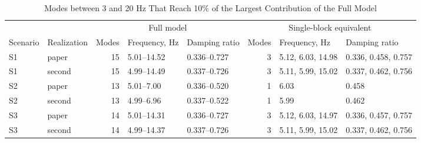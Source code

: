 \begin{table}[H]
\centering\small\setlength{\tabcolsep}{4.5pt}
\caption{Modes between 3 and 20 Hz That Reach 10\% of the Largest Contribution of the Full Model}
\label{tab:modes}
\begin{tabular}{llrllrll}\toprule
 & & \multicolumn{3}{c}{Full model} & \multicolumn{3}{c}{Single-block equivalent}\\
Scenario & Realization & Modes & Frequency, Hz & Damping ratio & Modes & Frequency, Hz & Damping ratio\\\midrule
S1 & paper & 15 & 5.01--14.52 & 0.336--0.727 & 3 & 5.12, 6.03, 14.98 & 0.336, 0.458, 0.757 \\
S1 & second & 15 & 4.99--14.49 & 0.337--0.726 & 3 & 5.11, 5.99, 15.02 & 0.337, 0.462, 0.756 \\
S2 & paper & 13 & 5.01--7.00 & 0.336--0.520 & 1 & 6.03 & 0.458 \\
S2 & second & 13 & 4.99--6.96 & 0.337--0.522 & 1 & 5.99 & 0.462 \\
S3 & paper & 14 & 5.01--14.31 & 0.336--0.727 & 3 & 5.12, 6.03, 14.97 & 0.336, 0.457, 0.757 \\
S3 & second & 14 & 4.99--14.37 & 0.337--0.726 & 3 & 5.11, 5.99, 15.02 & 0.337, 0.462, 0.756 \\
\bottomrule\end{tabular}\end{table}
